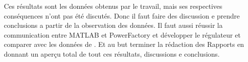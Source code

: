 
Ces résultats sont les données obtenus par le travail, mais ses respectives conséquences n'ont pas été discutés. Donc il faut faire des discussion e prendre conclusions a partir de la observation des données. Il faut aussi réussir la communication entre MATLAB et PowerFactory et développer le régulateur et comparer avec les données de \cite{cosson:tel-01374469}. Et au but terminer la rédaction des Rapports en donnant un aperçu total de tout ces résultats, discussions e conclusions.

